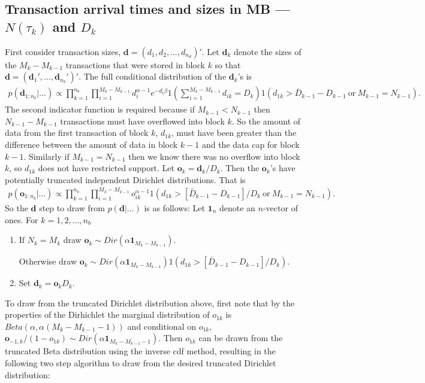 \documentclass{article}
\begin{document}
\subsection{Transaction arrival times and sizes in MB --- $N(\tau_k)$ and $D_k$}
First consider transaction sizes, $\bm{d}=(d_1,d_2,\dots,d_{n_d})'$. Let $\bm{d}_k$ denote the sizes of the $M_k - M_{k-1}$ transactions that were stored in block $k$ so that $\bm{d} = (\bm{d}_1',\dots,\bm{d}_{n_{b}}')'$. The full conditional distribution of the $\bm{d}_k$'s is
\begin{align*}
p(\bm{d}_{1:n_{b}}|...)\propto \prod_{k=1}^{n_b}\prod_{i=1}^{M_k - M_{k-1}} d_i^{\alpha - 1}e^{-d_i\beta}1\left(\sum_{i=1}^{M_k - M_{k-1}} d_{ik}= D_k\right)1\left(d_{1k} > \bar{D}_{k-1} - D_{k-1} \mathrm{\ or\ } M_{k-1} = N_{k-1}\right).
\end{align*}
The second indicator function is required because if $M_{k-1} < N_{k-1}$ then $N_{k-1} - M_{k-1}$ transactions must have overflowed into block $k$. So the amount of data from the first transaction of block $k$, $d_{1k}$, must have been greater than the difference between the amount of data in block $k-1$ and the data cap for block $k-1$. Similarly if $M_{k-1} = N_{k-1}$ then we know there was no overflow into block $k$, so $d_{1k}$ does not have restricted support. Let $\bm{o}_k = \bm{d}_k/D_k$. Then the $\bm{o}_k$'s have potentially truncated independent Dirichlet distributions. That is
\begin{align*}
p(\bm{o}_{1:n_b}|...)\propto \prod_{k=1}^{n_b} \prod_{i=1}^{M_k - M_{k-1}}o_{ik}^{\alpha - 1} 1\left(d_{1k} > [\bar{D}_{k-1} - D_{k-1}]/D_{k} \mathrm{\ or\ } M_{k-1} = N_{k-1}\right).
\end{align*}
So the $\bm{d}$ step to draw from $p(\bm{d}|...)$ is as follows: Let $\bm{1}_n$ denote an $n$-vector of ones. For $k=1,2,\dots,n_b$
\begin{enumerate}
\item If $N_k = M_k$ draw $\bm{o}_{k} \sim Dir(\alpha\bm{1}_{M_k - M_{k-1}})$.

  Otherwise draw $\bm{o}_{k} \sim Dir(\alpha\bm{1}_{M_k - M_{k-1}})1(d_{1k} > [\bar{D}_{k-1} - D_{k-1}]/D_k)$.
\item Set $\bm{d}_k = \bm{o}_kD_k$.
\end{enumerate}
To draw from the truncated Dirichlet distribution above, first note that by the properties of the Dirhichlet the marginal distribution of $o_{1k}$ is $Beta(\alpha, \alpha(M_k - M_{k-1} - 1))$ and conditional on $o_{1k}$, $\bm{o}_{-1,k}/(1 - o_{1k}) \sim Dir(\alpha\bm{1}_{M_k - M_{k-1} - 1})$. Then $o_{1k}$ can be drawn from the truncated Beta distribution using the inverse cdf method, resulting in the following two step algorithm to draw from the desired truncated Dirichlet distribution:
\end{document}
